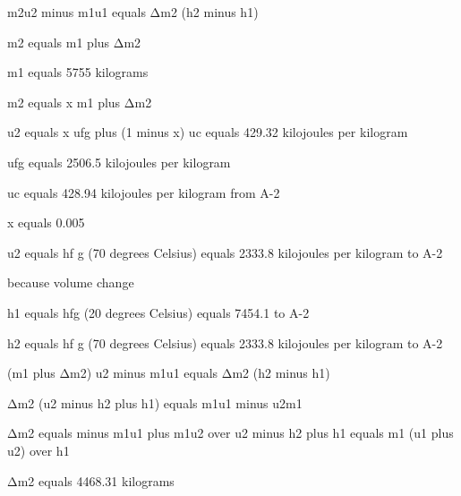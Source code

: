 m2u2 minus m1u1 equals Δm2 (h2 minus h1)

m2 equals m1 plus Δm2

m1 equals 5755 kilograms

m2 equals x m1 plus Δm2

u2 equals x ufg plus (1 minus x) uc equals 429.32 kilojoules per kilogram

ufg equals 2506.5 kilojoules per kilogram

uc equals 428.94 kilojoules per kilogram from A-2

x equals 0.005

u2 equals hf g (70 degrees Celsius) equals 2333.8 kilojoules per kilogram to A-2

because volume change

h1 equals hfg (20 degrees Celsius) equals 7454.1 to A-2

h2 equals hf g (70 degrees Celsius) equals 2333.8 kilojoules per kilogram to A-2

(m1 plus Δm2) u2 minus m1u1 equals Δm2 (h2 minus h1)

Δm2 (u2 minus h2 plus h1) equals m1u1 minus u2m1

Δm2 equals minus m1u1 plus m1u2 over u2 minus h2 plus h1 equals m1 (u1 plus u2) over h1

Δm2 equals 4468.31 kilograms